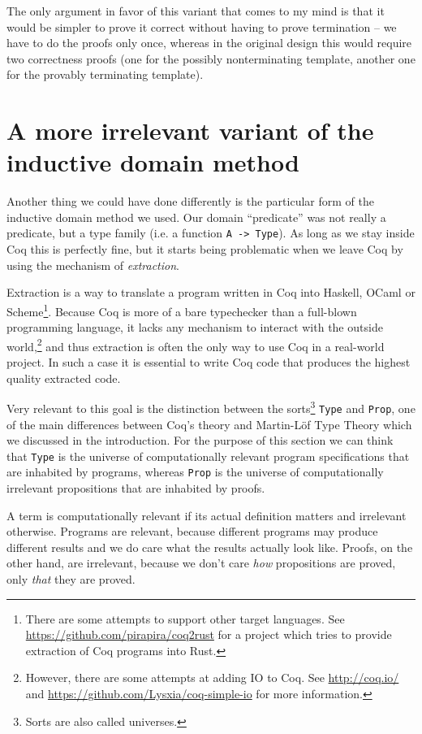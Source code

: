 \documentclass[declaration,mgr,english,shortabstract]{iithesis}
\newcommand{\m}[1]{\texttt{#1}}
\begin{document}
The only argument in favor of this variant that comes to my mind is that it would be simpler to prove it correct without having to prove termination -- we have to do the proofs only once, whereas in the original design this would require two correctness proofs (one for the possibly nonterminating template, another one for the provably terminating template).

\section{A more irrelevant variant of the inductive domain method} \label{irrelevant}

Another thing we could have done differently is the particular form of the inductive domain method we used. Our domain ``predicate'' was not really a predicate, but a type family (i.e. a function \m{A -> Type}). As long as we stay inside Coq this is perfectly fine, but it starts being problematic when we leave Coq by using the mechanism of \textit{extraction}.

Extraction is a way to translate a program written in Coq into Haskell, OCaml or Scheme\footnote{There are some attempts to support other target languages. See \url{https://github.com/pirapira/coq2rust} for a project which tries to provide extraction of Coq programs into Rust.}. Because Coq is more of a bare typechecker than a full-blown programming language, it lacks any mechanism to interact with the outside world,\footnote{However, there are some attempts at adding IO to Coq. See \url{http://coq.io/} and \url{https://github.com/Lysxia/coq-simple-io} for more information.} and thus extraction is often the only way to use Coq in a real-world project. In such a case it is essential to write Coq code that produces the highest quality extracted code.

Very relevant to this goal is the distinction between the sorts\footnote{Sorts are also called universes.} \m{Type} and \m{Prop}, one of the main differences between Coq's theory and Martin-L\"{o}f Type Theory which we discussed in the introduction. For the purpose of this section we can think that \m{Type} is the universe of computationally relevant program specifications that are inhabited by programs, whereas \m{Prop} is the universe of computationally irrelevant propositions that are inhabited by proofs.

A term is computationally relevant if its actual definition matters and irrelevant otherwise. Programs are relevant, because different programs may produce different results and we do care what the results actually look like. Proofs, on the other hand, are irrelevant, because we don't care \textit{how} propositions are proved, only \textit{that} they are proved.
\end{document}
